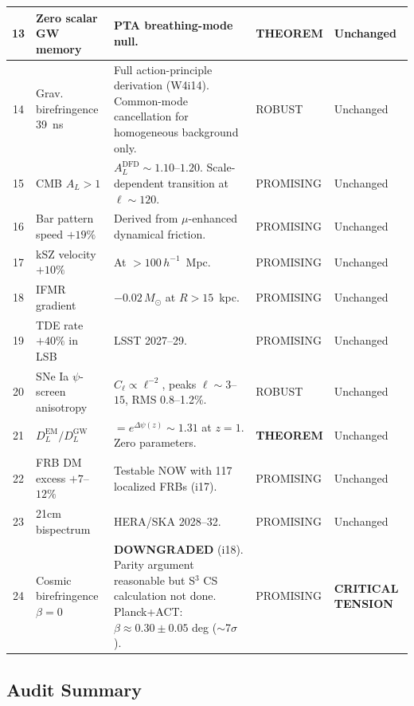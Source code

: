 \documentclass[11pt]{article}
\begin{document}
\begin{longtable}{clp{5cm}ll}
\midrule
13 & Zero scalar GW memory & PTA breathing-mode null. & \textbf{THEOREM} & Unchanged \\
\midrule
14 & Grav. birefringence 39~ns & Full action-principle derivation (W4i14). Common-mode cancellation for homogeneous background only. & ROBUST & Unchanged \\
\midrule
15 & CMB $A_L > 1$ & $A_L^\text{DFD} \sim 1.10$--$1.20$. Scale-dependent transition at $\ell \sim 120$. & PROMISING & Unchanged \\
\midrule
16 & Bar pattern speed $+19\%$ & Derived from $\mu$-enhanced dynamical friction. & PROMISING & Unchanged \\
\midrule
17 & kSZ velocity $+10\%$ & At $>100\,h^{-1}$~Mpc. & PROMISING & Unchanged \\
\midrule
18 & IFMR gradient & $-0.02\,M_\odot$ at $R > 15$~kpc. & PROMISING & Unchanged \\
\midrule
19 & TDE rate $+40\%$ in LSB & LSST 2027--29. & PROMISING & Unchanged \\
\midrule
20 & SNe Ia $\psi$-screen anisotropy & $C_\ell \propto \ell^{-2}$, peaks $\ell \sim 3$--$15$, RMS 0.8--1.2\%. & ROBUST & Unchanged \\
\midrule
21 & $D_L^\text{EM}/D_L^\text{GW}$ & $= e^{\Delta\psi(z)} \sim 1.31$ at $z=1$. Zero parameters. & \textbf{THEOREM} & Unchanged \\
\midrule
22 & FRB DM excess $+7$--$12\%$ & Testable NOW with 117 localized FRBs (i17). & PROMISING & Unchanged \\
\midrule
23 & 21cm bispectrum & HERA/SKA 2028--32. & PROMISING & Unchanged \\
\midrule
24 & Cosmic birefringence $\beta = 0$ & \textbf{DOWNGRADED} (i18). Parity argument reasonable but S$^3$ CS calculation not done. Planck+ACT: $\beta \approx 0.30 \pm 0.05$ deg ($\sim$7$\sigma$). & PROMISING & \textbf{CRITICAL TENSION} \\
\bottomrule
\end{longtable}

\subsection{Audit Summary}
\end{document}
